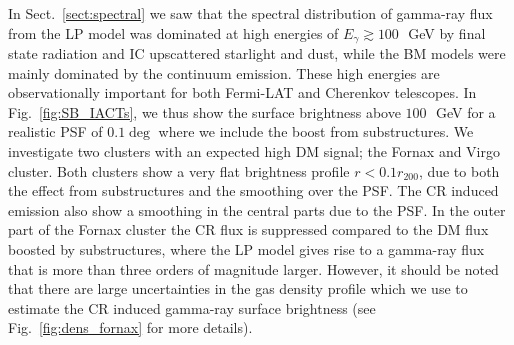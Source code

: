 \documentclass[10pt,aps,pra,reprint,amsmath,amsfonts,amssymb,showpacs,nofootinbib,floatfix]{revtex4-1}
\newcommand{\rvir}{r_{200}}
\begin{document}
In Sect.~\ref{sect:spectral} we saw that the spectral distribution of
gamma-ray flux from the LP model was dominated at high energies of
$E_\gamma\gtrsim 100\,$~GeV by final state radiation and IC upscattered
starlight and dust, while the BM models were mainly dominated by the
continuum emission. These high energies are observationally important
for both Fermi-LAT and Cherenkov telescopes. In
Fig.~\ref{fig:SB_IACTs}, we thus show the surface brightness above
$100\,$~GeV for a realistic PSF of $0.1\deg$ where we include the
boost from substructures. We investigate two clusters with an expected
high DM signal; the Fornax and Virgo cluster. Both clusters show a
very flat brightness profile $r<0.1\rvir$, due to both the effect from
substructures and the smoothing over the PSF. The CR induced emission
also show a smoothing in the central parts due to the PSF. In the
outer part of the Fornax cluster the CR flux is suppressed compared to
the DM flux boosted by substructures, where the LP model gives rise to
a gamma-ray flux that is more than three orders of magnitude
larger. However, it should be noted that there are large uncertainties
in the gas density profile which we use to estimate the CR induced
gamma-ray surface brightness (see Fig.~\ref{fig:dens_fornax} for more
details).
\end{document}
